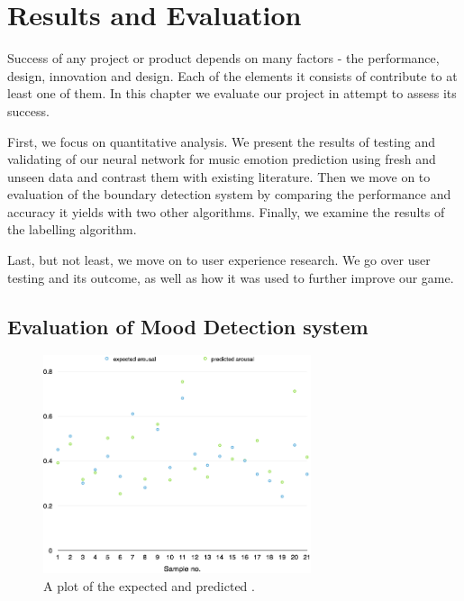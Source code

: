 
\chapter{Results and Evaluation} %

\label{Chapter6} %



Success of any project or product depends on many factors - the performance, design, innovation and design. Each of the elements it consists of contribute to at least one of them. 
In this chapter we evaluate our project in attempt to assess its success.

First, we focus on quantitative analysis. We present the results of testing and validating of our neural network for music emotion prediction using fresh and unseen data and contrast them with existing literature. Then we move on to evaluation of the boundary detection system by comparing the performance and accuracy it yields with two other algorithms. Finally, we examine the results of the labelling algorithm.

Last, but not least, we move on to user experience research. We go over user testing and its outcome, as well as how it was used to further improve our game. 

\vspace{10pt}

\section{Evaluation of Mood Detection system}

\begin{figure}[t]
    \includegraphics[width=0.7\textwidth]{Figures/finalarousal}
    \centering

  \caption{A plot of the expected and predicted .}
  \label{fig:anneval}
\end{figure}


